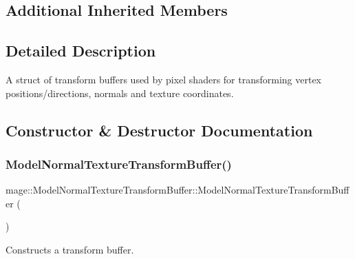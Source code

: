 \subsection*{Additional Inherited Members}


\subsection{Detailed Description}
A struct of transform buffers used by pixel shaders for transforming vertex positions/directions, normals and texture coordinates. 

\subsection{Constructor \& Destructor Documentation}
\hypertarget{structmage_1_1_model_normal_texture_transform_buffer_ad419df3f0977a4d9185489c19e2237b6}{}\label{structmage_1_1_model_normal_texture_transform_buffer_ad419df3f0977a4d9185489c19e2237b6} 
\subsubsection{\texorpdfstring{Model\+Normal\+Texture\+Transform\+Buffer()}{ModelNormalTextureTransformBuffer()}\hspace{0.1cm}{\footnotesize\ttfamily [1/3]}}
{\footnotesize\ttfamily mage\+::\+Model\+Normal\+Texture\+Transform\+Buffer\+::\+Model\+Normal\+Texture\+Transform\+Buffer (\begin{DoxyParamCaption}{ }\end{DoxyParamCaption})}

Constructs a transform buffer. \hypertarget{structmage_1_1_model_normal_texture_transform_buffer_abf62d5e6d36c5a012907933d9f5cdcd8}{}\label{structmage_1_1_model_normal_texture_transform_buffer_abf62d5e6d36c5a012907933d9f5cdcd8} 
